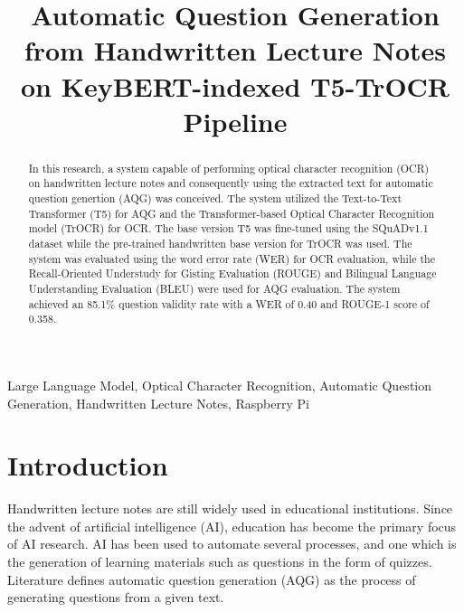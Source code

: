\documentclass[conference]{IEEEtran}
\begin{document}
\title{Automatic Question Generation from Handwritten Lecture Notes on
KeyBERT-indexed T5-TrOCR Pipeline}
\author{
}

\maketitle

\begin{abstract}
In this research, a system capable of performing optical character recognition
(OCR) on handwritten lecture notes and consequently using the extracted text for
automatic question genertion (AQG) was conceived. The system utilized the Text-to-Text
Transformer (T5) for AQG and the Transformer-based Optical Character Recognition 
model (TrOCR) for OCR. The base version T5 was fine-tuned
using the SQuADv1.1 dataset while the pre-trained handwritten base version for
TrOCR was used. The system was evaluated using the word error rate (WER) for
OCR evaluation, while the Recall-Oriented Understudy for Gisting Evaluation (ROUGE)
and Bilingual Language Understanding Evaluation (BLEU) were used for AQG evaluation. 
The system achieved an 85.1\% question validity rate with a WER of 0.40 and ROUGE-1 
score of 0.358.
\end{abstract}

\begin{IEEEkeywords}
Large Language Model, Optical Character Recognition,
Automatic Question Generation, Handwritten Lecture Notes, Raspberry Pi
\end{IEEEkeywords}

\section{Introduction}
Handwritten lecture notes are still widely used in educational institutions.
Since the advent of artificial intelligence (AI), education has become
the primary focus of AI research. AI has been used to automate several processes,
and one which is the generation of learning materials such as questions in the
form of quizzes. Literature defines automatic question generation (AQG) as the
process of generating questions from a given text. 
\end{document}
